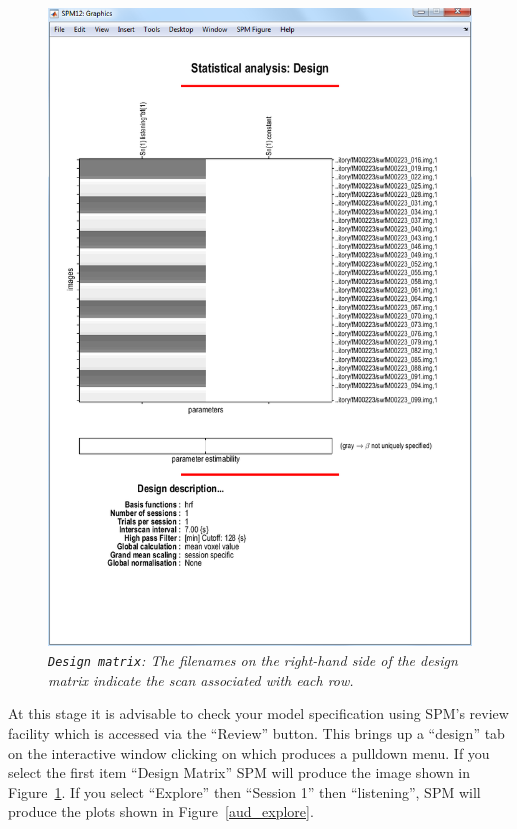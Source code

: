\begin{figure}
\begin{center}
\includegraphics[width=125mm]{auditory/design}
\caption{\emph{\texttt{Design matrix}: The filenames on the right-hand side of the design matrix indicate the scan associated with each row.\label{aud_design}}}
\end{center}
\end{figure}

At this stage it is advisable to check your model specification using SPM's review facility which is accessed via the ``Review'' button. This brings up a ``design'' tab on the interactive window clicking on which produces a pulldown menu. If you select the first item ``Design Matrix'' SPM will produce the image shown in Figure~\ref{aud_design}. If you select ``Explore'' then ``Session 1'' then ``listening'', SPM will produce the plots shown in Figure~\ref{aud_explore}.


